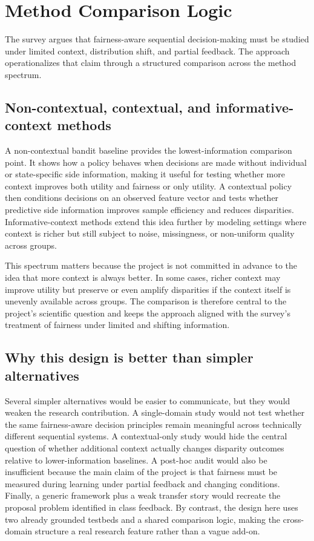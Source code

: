 \documentclass{IEEEtran}
\begin{document}
\section{Method Comparison Logic}
The survey argues that fairness-aware sequential decision-making must be studied under
limited context, distribution shift, and partial feedback. The approach operationalizes that
claim through a structured comparison across the method spectrum.

\subsection{Non-contextual, contextual, and informative-context methods}
A non-contextual bandit baseline provides the lowest-information comparison point. It shows
how a policy behaves when decisions are made without individual or state-specific side
information, making it useful for testing whether more context improves both utility and
fairness or only utility. A contextual policy then conditions decisions on an observed feature
vector and tests whether predictive side information improves sample efficiency and reduces
disparities. Informative-context methods extend this idea further by modeling settings where
context is richer but still subject to noise, missingness, or non-uniform quality across groups.

This spectrum matters because the project is not committed in advance to the idea that more
context is always better. In some cases, richer context may improve utility but preserve or
even amplify disparities if the context itself is unevenly available across groups. The
comparison is therefore central to the project's scientific question and keeps the approach
aligned with the survey's treatment of fairness under limited and shifting information.

\subsection{Why this design is better than simpler alternatives}
Several simpler alternatives would be easier to communicate, but they would weaken the
research contribution. A single-domain study would not test whether the same fairness-aware
decision principles remain meaningful across technically different sequential systems. A
contextual-only study would hide the central question of whether additional context actually
changes disparity outcomes relative to lower-information baselines. A post-hoc audit would
also be insufficient because the main claim of the project is that fairness must be measured
during learning under partial feedback and changing conditions. Finally, a generic framework
plus a weak transfer story would recreate the proposal problem identified in class feedback.
By contrast, the design here uses two already grounded testbeds and a shared comparison
logic, making the cross-domain structure a real research feature rather than a vague add-on.
\end{document}
